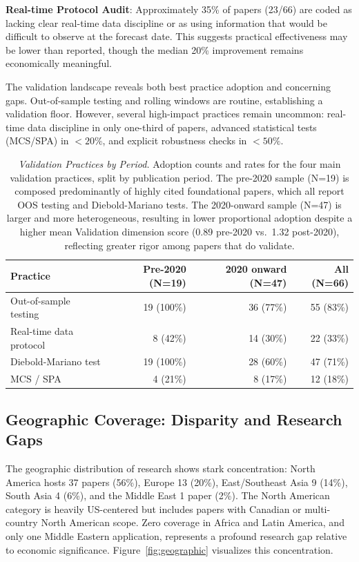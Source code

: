 \documentclass[11pt,twocolumn]{article}
\begin{document}
\footnotesize \textbf{Real-time Protocol Audit}: Approximately 35\% of papers (23/66) are coded as lacking clear real-time data discipline or as using information that would be difficult to observe at the forecast date. This suggests practical effectiveness may be lower than reported, though the median 20\% improvement remains economically meaningful.\normalsize

\normalsize The validation landscape reveals both best practice adoption and concerning gaps. Out-of-sample testing and rolling windows are routine, establishing a validation floor. However, several high-impact practices remain uncommon: real-time data discipline in only one-third of papers, advanced statistical tests (MCS/SPA) in $<20\%$, and explicit robustness checks in $<50\%$.

\begin{table}[htbp]
\centering
\small
\caption{\textit{Validation Practices by Period.} Adoption counts and rates for the four main validation practices, split by publication period. The pre-2020 sample (N=19) is composed predominantly of highly cited foundational papers, which all report OOS testing and Diebold-Mariano tests. The 2020-onward sample (N=47) is larger and more heterogeneous, resulting in lower proportional adoption despite a higher mean Validation dimension score (0.89 pre-2020 vs.~1.32 post-2020), reflecting greater rigor among papers that do validate.}
\label{tab:validation_by_era}
\begin{tabular}{|l|r|r|r|}
\hline
\textbf{Practice} & \textbf{Pre-2020 (N=19)} & \textbf{2020 onward (N=47)} & \textbf{All (N=66)} \\
\hline
Out-of-sample testing   & 19 (100\%) & 36 (77\%)  & 55 (83\%) \\
Real-time data protocol & 8  (42\%)  & 14 (30\%)  & 22 (33\%) \\
Diebold-Mariano test    & 19 (100\%) & 28 (60\%)  & 47 (71\%) \\
MCS / SPA               & 4  (21\%)  & 8  (17\%)  & 12 (18\%) \\
\hline
\end{tabular}
\end{table}

\subsection{Geographic Coverage: Disparity and Research Gaps}

The geographic distribution of research shows stark concentration: North America hosts 37 papers (56\%), Europe 13 (20\%), East/Southeast Asia 9 (14\%), South Asia 4 (6\%), and the Middle East 1 paper (2\%). The North American category is heavily US-centered but includes papers with Canadian or multi-country North American scope. Zero coverage in Africa and Latin America, and only one Middle Eastern application, represents a profound research gap relative to economic significance. Figure~\ref{fig:geographic} visualizes this concentration.
\end{document}
